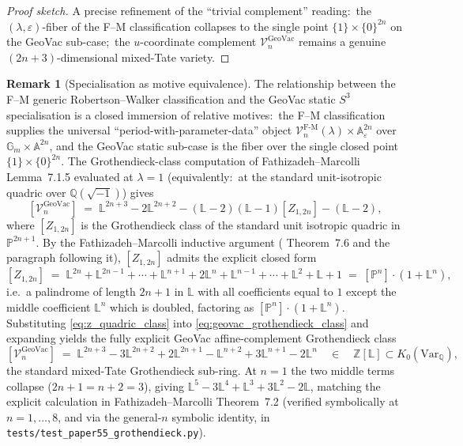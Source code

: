 \documentclass[11pt,a4paper]{article}
\theoremstyle{plain}
\theoremstyle{definition}
\newtheorem{remark}[theorem]{Remark}
\newcommand{\sthree}{S^{3}}
\newcommand{\Z}{\mathbb{Z}}
\newcommand{\Q}{\mathbb{Q}}
\begin{document}
\begin{proof}[Proof sketch]
A precise refinement of the ``trivial complement'' reading:\ the
$(\lambda, \varepsilon)$-fiber of the F--M classification collapses to the
single point $\{1\} \times \{0\}^{2n}$ on the GeoVac sub-case;\ the
$u$-coordinate complement $\mathcal{V}_n^{\mathrm{GeoVac}}$ remains a
genuine $(2n + 3)$-dimensional mixed-Tate variety.
\end{proof}

\begin{remark}[Specialisation as motive equivalence]
\label{rem:m2_specialisation}
The relationship between the F--M generic Robertson--Walker classification
and the GeoVac static $\sthree$ specialisation is a closed immersion of
relative motives:\ the F--M classification supplies the universal
``period-with-parameter-data'' object
$\mathcal{V}_n^{\mathrm{F\text{-}M}}(\lambda) \times \mathbb{A}^{2n}_{\varepsilon}$
over $\mathbb{G}_m \times \mathbb{A}^{2n}$, and the GeoVac static sub-case
is the fiber over the single closed point
$\{1\} \times \{0\}^{2n}$.  The Grothendieck-class computation of
Fathizadeh--Marcolli Lemma~7.1.5 evaluated at $\lambda = 1$
(equivalently:\ at the standard unit-isotropic quadric over $\Q(\sqrt{-1})$)
gives
\begin{equation}
\label{eq:geovac_grothendieck_class}
[\mathcal{V}_n^{\mathrm{GeoVac}}] \;=\;
\mathbb{L}^{2n+3} - 2 \mathbb{L}^{2n+2}
- (\mathbb{L} - 2)(\mathbb{L} - 1)[Z_{1, 2n}] - (\mathbb{L} - 2),
\end{equation}
where $[Z_{1, 2n}]$ is the Grothendieck class of the standard unit isotropic
quadric in $\mathbb{P}^{2n+1}$.  By the Fathizadeh--Marcolli inductive
argument (\cite{fathizadeh_marcolli2016} Theorem~7.6 and the paragraph
following it), $[Z_{1, 2n}]$ admits the explicit closed form
\begin{equation}
\label{eq:z_quadric_class}
[Z_{1, 2n}]
\;=\;
\mathbb{L}^{2n} + \mathbb{L}^{2n-1} + \cdots + \mathbb{L}^{n+1}
+ 2 \mathbb{L}^n
+ \mathbb{L}^{n-1} + \cdots + \mathbb{L}^2 + \mathbb{L} + 1
\;=\; [\mathbb{P}^n] \cdot (1 + \mathbb{L}^n),
\end{equation}
i.e.\ a palindrome of length $2n + 1$ in $\mathbb{L}$ with all coefficients
equal to $1$ except the middle coefficient $\mathbb{L}^n$ which is doubled,
factoring as $[\mathbb{P}^n] \cdot (1 + \mathbb{L}^n)$.  Substituting
\eqref{eq:z_quadric_class} into \eqref{eq:geovac_grothendieck_class} and
expanding yields the fully explicit GeoVac affine-complement Grothendieck class
\begin{equation}
\label{eq:geovac_grothendieck_class_explicit}
[\mathcal{V}_n^{\mathrm{GeoVac}}]
\;=\;
\mathbb{L}^{2n+3} - 3 \mathbb{L}^{2n+2} + 2 \mathbb{L}^{2n+1}
- \mathbb{L}^{n+2} + 3 \mathbb{L}^{n+1} - 2 \mathbb{L}^n
\quad \in \quad \Z[\mathbb{L}] \subset K_0(\mathrm{Var}_\Q),
\end{equation}
the standard mixed-Tate Grothendieck sub-ring.  At $n = 1$ the two middle
terms collapse ($2n + 1 = n + 2 = 3$), giving
$\mathbb{L}^5 - 3 \mathbb{L}^4 + \mathbb{L}^3 + 3 \mathbb{L}^2 - 2 \mathbb{L}$,
matching the explicit calculation in Fathizadeh--Marcolli Theorem~7.2
(verified symbolically at $n = 1, \ldots, 8$, and via the general-$n$
symbolic identity, in \texttt{tests/test\_paper55\_grothendieck.py}).


\end{remark}
\end{document}
